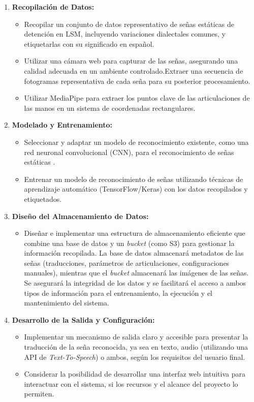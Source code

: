 \begin{enumerate}
    \item \textbf{Recopilación de Datos:}
        \begin{itemize}
            \item Recopilar un conjunto de datos representativo de señas estáticas de detención en LSM, incluyendo variaciones dialectales comunes, y etiquetarlas con su significado en español.
            \item Utilizar una cámara web para capturar de las señas, asegurando una calidad adecuada en un ambiente controlado.Extraer una secuencia de fotogramas representativa de cada seña para su posterior procesamiento.
            \item Utilizar MediaPipe para extraer los puntos clave de las articulaciones de las manos en un sistema de coordenadas rectangulares.
        \end{itemize}

    \item \textbf{Modelado y Entrenamiento:}
        \begin{itemize}
            \item Seleccionar y adaptar un modelo de reconocimiento existente, como una red neuronal convolucional (CNN), para el reconocimiento de señas estáticas \cite{ref7}.
            \item Entrenar un modelo de reconocimiento de señas utilizando técnicas de aprendizaje automático (TensorFlow/Keras) con los datos recopilados y etiquetados.
        \end{itemize}

    \item \textbf{Diseño del Almacenamiento de Datos:}
        \begin{itemize}
            \item Diseñar e implementar una estructura de almacenamiento eficiente que combine una base de datos y un \textit{bucket} (como S3) para gestionar la información recopilada. La base de datos almacenará metadatos de las señas (traducciones, parámetros de articulaciones, configuraciones manuales), mientras que el \textit{bucket} almacenará las imágenes de las señas. Se asegurará la integridad de los datos y se facilitará el acceso a ambos tipos de información para el entrenamiento, la ejecución y el mantenimiento del sistema.
        \end{itemize}

    \item \textbf{Desarrollo de la Salida y Configuración:}
        \begin{itemize}
            \item Implementar un mecanismo de salida claro y accesible para presentar la traducción de la seña reconocida, ya sea en texto, audio (utilizando una API de \textit{Text-To-Speech}) o ambos, según los requisitos del usuario final.
            \item Considerar la posibilidad de desarrollar una interfaz web intuitiva para interactuar con el sistema, si los recursos y el alcance del proyecto lo permiten.
        \end{itemize}
\end{enumerate}